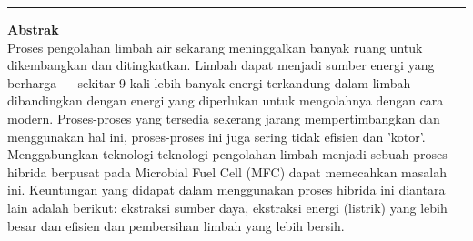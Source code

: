 \documentclass[10pt,a4paper]{report}
\begin{document}
\rule{\textwidth}{0.4pt}
\vspace{1cm}
\begin{center}
\textbf{Abstrak}\\

\justify
\noindent Proses pengolahan limbah air sekarang meninggalkan banyak ruang untuk dikembangkan dan ditingkatkan. Limbah dapat menjadi sumber energi yang berharga --- sekitar 9 kali lebih banyak energi terkandung dalam limbah dibandingkan dengan energi yang diperlukan untuk mengolahnya dengan cara modern. Proses-proses yang tersedia sekerang jarang mempertimbangkan dan menggunakan hal ini, proses-proses ini juga sering tidak efisien dan 'kotor'.
Menggabungkan teknologi-teknologi pengolahan limbah menjadi sebuah proses hibrida berpusat pada Microbial Fuel Cell (MFC) dapat memecahkan masalah ini. Keuntungan yang didapat dalam menggunakan proses hibrida ini diantara lain adalah berikut: ekstraksi sumber daya, ekstraksi energi (listrik) yang lebih besar dan efisien dan pembersihan limbah yang lebih bersih.
\end{center}
\end{document}
